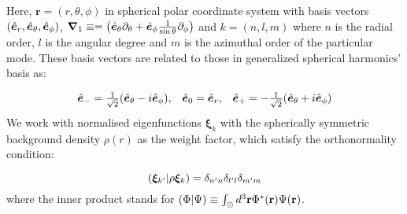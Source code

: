 Here, $\boldsymbol{r} = (r,\theta,\phi)$ in spherical polar coordinate system with basis vectors $(\hat{\bm{e}}_{r},\hat{\bm{e}}_{\theta},\hat{\bm{e}}_{\phi})$, $\bm{\nabla}_1 \equiv = \left( \hat{\bm{e}}_{\theta}\partial_{\theta} + \hat{\bm{e}}_{\phi}\frac{1}{\sin\theta}\partial_{\phi}  \right)$ and $k = (n,l,m)$ where $n$ is the radial order, $l$ is the angular degree and $m$ is the azimuthal order of the particular \snr mode.  These basis vectors are related to those in generalized spherical harmonics' basis as:
 
 \begin{equation}
     \begin{array}{ccc} \hat{\bm{e}}_{-} = \frac{1}{\sqrt{2}}(\hat{\bm{e}}_{\theta} - i \hat{\bm{e}}_{\phi}), & \hat{\bm{e}}_{0} = \hat{\bm{e}}_{r}, & \hat{\bm{e}}_{+} = -\frac{1}{\sqrt{2}}(\hat{\bm{e}}_{\theta} + i \hat{\bm{e}}_{\phi}) \\ \end{array}
 \end{equation}
We work with normalised eigenfunctions $\boldsymbol{\xi}_k$ with the spherically symmetric background density $\rho(r)$ as the weight factor, which satisfy the orthonormality condition:

\begin{equation} \label{eqn: orthonormality}
  (\bm{\xi}_{k'}|\rho\bm{\xi}_{k}) = \delta_{n'n} \delta_{l' l} \delta_{m' m}  
\end{equation}
where the inner product \inner{}{} stands for $(\Phi|\Psi) \equiv \int_{\odot} d^3\mathbf{r} \Phi^*(\mathbf{r}) \Psi(\mathbf{r})$.

